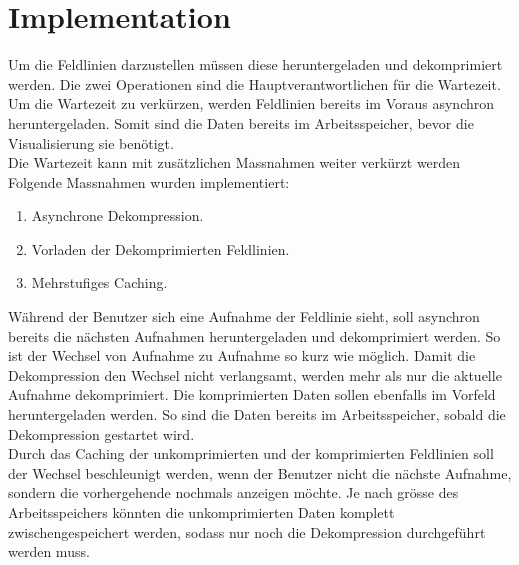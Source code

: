 \section{Implementation}
Um die Feldlinien darzustellen müssen diese heruntergeladen und dekomprimiert werden. Die zwei Operationen sind die Hauptverantwortlichen für die Wartezeit. Um die Wartezeit zu verkürzen, werden Feldlinien bereits im Voraus asynchron heruntergeladen. Somit sind die Daten bereits im Arbeitsspeicher, bevor die Visualisierung sie benötigt.\\
Die Wartezeit kann mit zusätzlichen Massnahmen weiter verkürzt werden Folgende Massnahmen wurden implementiert:
\begin{enumerate}
	\item Asynchrone Dekompression.
	\item Vorladen der Dekomprimierten Feldlinien.
	\item Mehrstufiges Caching.
\end{enumerate}
Während der Benutzer sich eine Aufnahme der Feldlinie sieht, soll asynchron bereits die nächsten Aufnahmen heruntergeladen und dekomprimiert werden. So ist der Wechsel von Aufnahme zu Aufnahme so kurz wie möglich. Damit die Dekompression den Wechsel nicht verlangsamt, werden mehr als nur die aktuelle Aufnahme dekomprimiert. Die komprimierten Daten sollen ebenfalls im Vorfeld heruntergeladen werden. So sind die Daten bereits im Arbeitsspeicher, sobald die Dekompression gestartet wird.\\
Durch das Caching der unkomprimierten und der komprimierten Feldlinien soll der Wechsel beschleunigt werden, wenn der Benutzer nicht die nächste Aufnahme, sondern die vorhergehende nochmals anzeigen möchte. Je nach grösse des Arbeitsspeichers könnten die unkomprimierten Daten komplett zwischengespeichert werden, sodass nur noch die Dekompression durchgeführt werden muss.\\

